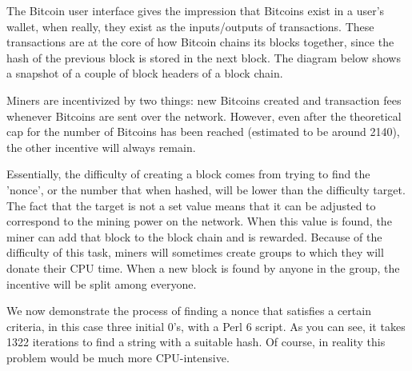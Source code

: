 \documentclass[12pt]{article}
\begin{document}
The Bitcoin user interface gives the impression that Bitcoins exist in a user's wallet, when really, they exist as the inputs/outputs of transactions. These transactions are at the core of how Bitcoin chains its blocks together, since the hash of the previous block is stored in the next block. The diagram below shows a snapshot of a couple of block headers of a block chain.

\begin{center}
\end{center}

Miners are incentivized by two things: new Bitcoins created and transaction fees whenever Bitcoins are sent over the network. However, even after the theoretical cap for the number of Bitcoins has been reached (estimated to be around 2140), the other incentive will always remain.

Essentially, the difficulty of creating a block comes from trying to find the 'nonce', or the number that when hashed, will be lower than the difficulty target. The fact that the target is not a set value means that it can be adjusted to correspond to the mining power on the network. When this value is found, the miner can add that block to the block chain and is rewarded. Because of the difficulty of this task, miners will sometimes create groups to which they will donate their CPU time. When a new block is found by anyone in the group, the incentive will be split among everyone.

We now demonstrate the process of finding a nonce that satisfies a certain criteria, in this case three initial 0's, with a Perl 6 script. As you can see, it takes 1322 iterations to find a string with a suitable hash. Of course, in reality this problem would be much more CPU-intensive.
\end{document}
